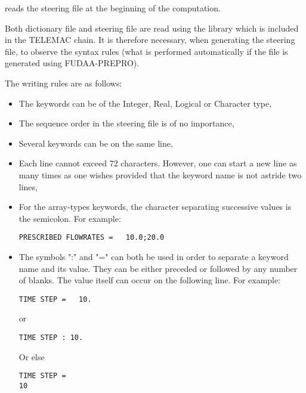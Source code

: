  reads the steering file at the beginning of the computation.

Both dictionary file and steering file are read using the 
library which is included in the TELEMAC chain. It is therefore necessary,
when generating the steering file, to observe the  syntax
rules (what is performed automatically if the file is generated using
FUDAA-PREPRO).

The writing rules are as follows:

\begin{itemize}
\item The keywords can be of the Integer, Real, Logical or Character type,

\item The sequence order in the steering file is of no importance,

\item Several keywords can be on the same line,

\item Each line cannot exceed 72 characters. However, one can start a new line
as many times as one wishes provided that the keyword name is not astride two
lines,

\item For the array-types keywords, the character separating successive values
is the semicolon. For example:

\begin{lstlisting}[language=TelemacCas]
PRESCRIBED FLOWRATES =   10.0;20.0
\end{lstlisting}

\item The symbols ":" and "=" can both be used in order to separate a keyword
name and its value. They can be either preceded or followed by any number of
blanks. The value itself can occur on the following line. For example:

\begin{lstlisting}[language=TelemacCas]
TIME STEP =   10.
\end{lstlisting}

or

\begin{lstlisting}[language=TelemacCas]
TIME STEP : 10.
\end{lstlisting}

Or else

\begin{lstlisting}[language=TelemacCas]
TIME STEP =
10
\end{lstlisting}


\end{itemize}

